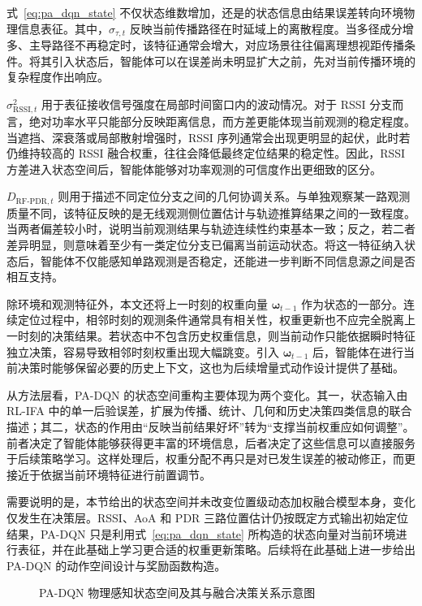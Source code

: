 式~\eqref{eq:pa_dqn_state} 不仅状态维数增加，还是的状态信息由结果误差转向环境物理信息表征。其中，\(\sigma_{\tau,t}\) 反映当前传播路径在时延域上的离散程度。当多径成分增多、主导路径不再稳定时，该特征通常会增大，对应场景往往偏离理想视距传播条件。将其引入状态后，智能体可以在误差尚未明显扩大之前，先对当前传播环境的复杂程度作出响应。

\(\sigma^2_{\mathrm{RSSI},t}\) 用于表征接收信号强度在局部时间窗口内的波动情况。对于 RSSI 分支而言，绝对功率水平只能部分反映距离信息，而方差更能体现当前观测的稳定程度。当遮挡、深衰落或局部散射增强时，RSSI 序列通常会出现更明显的起伏，此时若仍维持较高的 RSSI 融合权重，往往会降低最终定位结果的稳定性。因此，RSSI 方差进入状态空间后，智能体能够对功率观测的可信度作出更细致的区分。

\(D_{\mathrm{RF\mbox{-}PDR},t}\) 则用于描述不同定位分支之间的几何协调关系。与单独观察某一路观测质量不同，该特征反映的是无线观测侧位置估计与轨迹推算结果之间的一致程度。当两者偏差较小时，说明当前观测结果与轨迹连续性约束基本一致；反之，若二者差异明显，则意味着至少有一类定位分支已偏离当前运动状态。将这一特征纳入状态后，智能体不仅能感知单路观测是否稳定，还能进一步判断不同信息源之间是否相互支持。

除环境和观测特征外，本文还将上一时刻的权重向量 \(\boldsymbol{\omega}_{t-1}\) 作为状态的一部分。连续定位过程中，相邻时刻的观测条件通常具有相关性，权重更新也不应完全脱离上一时刻的决策结果。若状态中不包含历史权重信息，则当前动作只能依据瞬时特征独立决策，容易导致相邻时刻权重出现大幅跳变。引入 \(\boldsymbol{\omega}_{t-1}\) 后，智能体在进行当前决策时能够保留必要的历史上下文，这也为后续增量式动作设计提供了基础。

从方法层看，PA-DQN 的状态空间重构主要体现为两个变化。其一，状态输入由 RL-IFA 中的单一后验误差，扩展为传播、统计、几何和历史决策四类信息的联合描述；其二，状态的作用由“反映当前结果好坏”转为“支撑当前权重应如何调整”。前者决定了智能体能够获得更丰富的环境信息，后者决定了这些信息可以直接服务于后续策略学习。这样处理后，权重分配不再只是对已发生误差的被动修正，而更接近于依据当前环境特征进行前置调节。

需要说明的是，本节给出的状态空间并未改变位置级动态加权融合模型本身，变化仅发生在决策层。RSSI、AoA 和 PDR 三路位置估计仍按既定方式输出初始定位结果，PA-DQN 只是利用式~\eqref{eq:pa_dqn_state} 所构造的状态向量对当前环境进行表征，并在此基础上学习更合适的权重更新策略。后续将在此基础上进一步给出 PA-DQN 的动作空间设计与奖励函数构造。

\begin{figure}[htbp]
    \centering
    \vspace{4.5cm}
    \caption{PA-DQN 物理感知状态空间及其与融合决策关系示意图}
    \label{fig:pa_dqn_state_space}
\end{figure}

